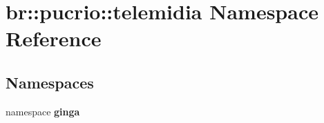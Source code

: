 \section{br::pucrio::telemidia Namespace Reference}
\label{namespacebr_1_1pucrio_1_1telemidia}


\subsection*{Namespaces}
\begin{CompactItemize}
\item 
namespace {\bf ginga}
\end{CompactItemize}
